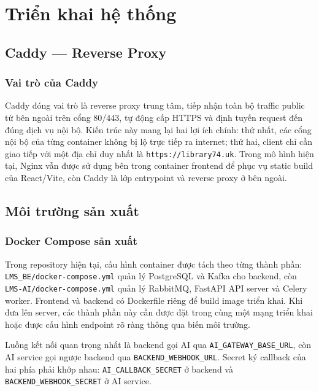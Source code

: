 \chapter{Triển khai hệ thống}

\section{Caddy --- Reverse Proxy}

\subsection{Vai trò của Caddy}

Caddy đóng vai trò là reverse proxy trung tâm, tiếp nhận toàn bộ traffic public
từ bên ngoài trên cổng 80/443, tự động cấp HTTPS và định tuyến request đến đúng
dịch vụ nội bộ. Kiến trúc này mang lại hai lợi ích chính: thứ nhất, các cổng
nội bộ của từng container không bị lộ trực tiếp ra internet; thứ hai, client chỉ
cần giao tiếp với một địa chỉ duy nhất là \texttt{https://library74.uk}. Trong
mô hình hiện tại, Nginx vẫn được sử dụng bên trong container frontend để phục vụ
static build của React/Vite, còn Caddy là lớp entrypoint và reverse proxy ở bên
ngoài.

\section{Môi trường sản xuất}

\subsection{Docker Compose sản xuất}

Trong repository hiện tại, cấu hình container được tách theo từng thành phần:
\texttt{LMS\_BE/docker-compose.yml} quản lý PostgreSQL và Kafka cho backend,
còn\\ \texttt{LMS-AI/docker-compose.yml} quản lý RabbitMQ, FastAPI API server và
Celery worker. Frontend và backend có Dockerfile riêng để build image triển
khai. Khi đưa lên server, các thành phần này cần được đặt trong cùng một mạng
triển khai hoặc được cấu hình endpoint rõ ràng thông qua biến môi trường.

Luồng kết nối quan trọng nhất là backend gọi AI qua
\texttt{AI\_GATEWAY\_BASE\_URL}, còn AI service gọi ngược backend qua
\texttt{BACKEND\_WEBHOOK\_URL}. Secret ký callback của hai phía phải khớp nhau:
\texttt{AI\_CALLBACK\_SECRET} ở backend và \texttt{BACKEND\_WEBHOOK\_SECRET}
ở AI service.

